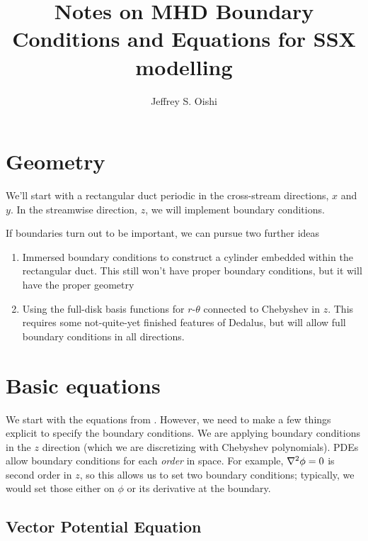 \documentclass{jpp}
\title{Notes on MHD Boundary Conditions and Equations for SSX modelling}
\author{Jeffrey S. Oishi\aff{1}
  \corresp{\email{joishi@bates.edu}}}
\affiliation{\aff{1}Department of Physics \& Astronomy, Bates College,
Lewiston, ME 02140, USA}
\begin{document}
\maketitle
\section{Geometry}
\label{sec:geom}

We'll start with a rectangular duct periodic in the cross-stream directions, $x$ and $y$. In the streamwise direction, $z$, we will implement boundary conditions.

If boundaries turn out to be important, we can pursue two further ideas

\begin{enumerate}
\item Immersed boundary conditions to construct a cylinder embedded within the rectangular duct. This still won't have proper boundary conditions, but it will have the proper geometry
\item Using the full-disk basis functions for $r$-$\theta$ connected to Chebyshev in $z$. This requires some not-quite-yet finished features of Dedalus, but will allow full boundary conditions in all directions.
\end{enumerate}
\section{Basic equations}
\label{sec:equations}

We start with the equations from \citet[][S14 hereafter]{2014PPCF...56f4003S}. However, we need to make a few things explicit to specify the boundary conditions. We are applying boundary conditions in the $z$ direction (which we are discretizing with Chebyshev polynomials). PDEs allow boundary conditions for each \emph{order} in space. For example, $\laplacian{\phi} = 0$ is second order in $z$, so this allows us to set two boundary conditions; typically, we would set those either on $\phi$ or its derivative at the boundary.


\subsection{Vector Potential Equation}
\label{sec:A_eq}
\end{document}
